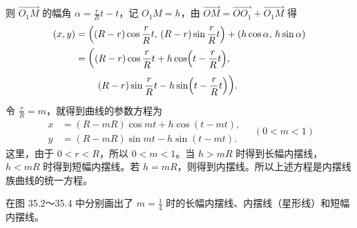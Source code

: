 \noindent
则 $\overrightarrow{O_1M}$ 的幅角 $\alpha=\frac{r}{R}t-t$，记 $O_1M=h$，由 $\overrightarrow{OM}=\overrightarrow{OO_1}+\overrightarrow{O_1M}$ 得
\begin{align*}
  (x, y) &= \Bigl((R-r)\cos\frac{r}{R}t,\, (R-r)\sin\frac{r}{R}t\Bigr) + (h\cos\alpha,\, h\sin\alpha) \\
         &= \biggl((R-r)\cos\frac{r}{R}t + h\cos\Bigl(t - \frac{r}{R}t\Bigr), \\
         &\qquad\ (R-r)\sin\frac{r}{R}t - h\sin\Bigl(t - \frac{r}{R}t\Bigr)\biggr).
\end{align*}
令 $\frac{r}{R}=m$，就得到曲线的参数方程为
\[
  \begin{aligned}
    x &= (R-mR)\cos mt + h\cos(t-mt), \\
    y &= (R-mR)\sin mt - h\sin(t-mt).
  \end{aligned}
  \quad (0<m<1)
\]
这里，由于 $0<r<R$，所以 $0<m<1$。当 $h>mR$ 时得到长幅内摆线，$h<mR$ 时得到短幅内摆线。若 $h=mR$，则得到内摆线。所以上述方程是内摆线族曲线的统一方程。

在图 35.2～35.4 中分别画出了 $m=\frac{1}{4}$ 时的长幅内摆线、内摆线（星形线）和短幅内摆线。

